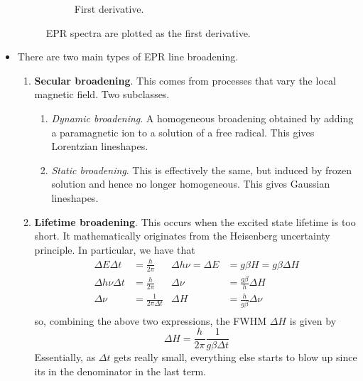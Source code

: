 \documentclass[../notes.tex]{subfiles}
\begin{document}
\begin{itemize}
\begin{figure}[h!]
\begin{subfigure}[b]{0.45\linewidth}
            \caption{First derivative.}
            \label{fig:EPR1stDerivb}
        \end{subfigure}
        \caption{EPR spectra are plotted as the first derivative.}
        \label{fig:EPR1stDeriv}
    \end{figure}
    \item There are two main types of EPR line broadening.
    \begin{enumerate}
        \item \textbf{Secular broadening}. This comes from processes that vary the local magnetic field. Two subclasses.
        \begin{enumerate}
            \item \emph{Dynamic broadening}. A homogeneous broadening obtained by adding a paramagnetic ion to a solution of a free radical. This gives Lorentzian lineshapes.
            \item \emph{Static broadening}. This is effectively the same, but induced by frozen solution and hence no longer homogeneous. This gives Gaussian lineshapes.
        \end{enumerate}
        \item \textbf{Lifetime broadening}. This occurs when the excited state lifetime is too short. It mathematically originates from the Heisenberg uncertainty principle. In particular, we have that
        \begin{align*}
            \Delta E\Delta t &= \frac{h}{2\pi}&
                \Delta h\nu = \Delta E &= g\beta H = g\beta\Delta H\\
            \Delta h\nu\Delta t &= \frac{h}{2\pi}&
                \Delta\nu &= \frac{g\beta}{h}\Delta H\\
            \Delta\nu &= \frac{1}{2\pi\Delta t}&
                \Delta H &= \frac{h}{g\beta}\Delta\nu\\
        \end{align*}
        so, combining the above two expressions, the FWHM $\Delta H$ is given by
        \begin{equation*}
            \Delta H = \frac{h}{2\pi}\frac{1}{g\beta\Delta t}
        \end{equation*}
        Essentially, as $\Delta t$ gets really small, everything else starts to blow up since its in the denominator in the last term.
    \end{enumerate}

\end{itemize}
\end{document}
